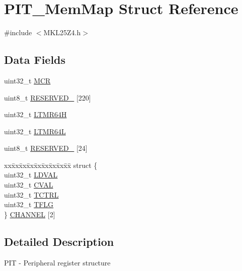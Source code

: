 \hypertarget{struct_p_i_t___mem_map}{}\section{P\+I\+T\+\_\+\+Mem\+Map Struct Reference}
\label{struct_p_i_t___mem_map}


{\ttfamily \#include $<$M\+K\+L25\+Z4.\+h$>$}

\subsection*{Data Fields}
\begin{DoxyCompactItemize}
\item 
uint32\+\_\+t \hyperlink{struct_p_i_t___mem_map_ab603c8e2ca1916ef6262af4b6a969e17}{M\+CR}
\item 
uint8\+\_\+t \hyperlink{struct_p_i_t___mem_map_a3964851a29318d7b51030db55fb714ae}{R\+E\+S\+E\+R\+V\+E\+D\+\_} \mbox{[}220\mbox{]}
\item 
uint32\+\_\+t \hyperlink{struct_p_i_t___mem_map_a2da67bf5ea0ee321d9a89500436061c6}{L\+T\+M\+R64H}
\item 
uint32\+\_\+t \hyperlink{struct_p_i_t___mem_map_ab3f43f5df1b7776759e6497948c4e17f}{L\+T\+M\+R64L}
\item 
uint8\+\_\+t \hyperlink{struct_p_i_t___mem_map_a53762b5329df1577d65fb443ec732a11}{R\+E\+S\+E\+R\+V\+E\+D\+\_} \mbox{[}24\mbox{]}
\item 
\begin{tabbing}
xx\=xx\=xx\=xx\=xx\=xx\=xx\=xx\=xx\=\kill
struct \{\\
\>uint32\_t \hyperlink{struct_p_i_t___mem_map_adffd273f683cea4a7f0aecbf45b2ea84}{LDVAL}\\
\>uint32\_t \hyperlink{struct_p_i_t___mem_map_af56425bca4f0078ab391a3e623073ce1}{CVAL}\\
\>uint32\_t \hyperlink{struct_p_i_t___mem_map_a08ca8a896322049f4b82825f4b0ba6ee}{TCTRL}\\
\>uint32\_t \hyperlink{struct_p_i_t___mem_map_a99ca085350eab8581351ff32448cde09}{TFLG}\\
\} \hyperlink{struct_p_i_t___mem_map_aad011cfa0183c0f07ecef26265e8275f}{CHANNEL} \mbox{[}2\mbox{]}\\

\end{tabbing}\end{DoxyCompactItemize}


\subsection{Detailed Description}
P\+IT -\/ Peripheral register structure 

